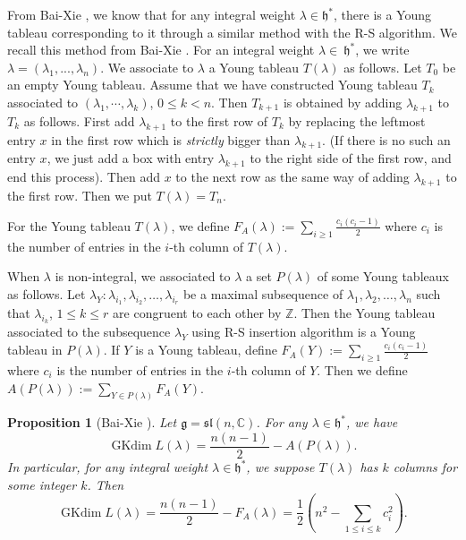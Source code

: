 \documentclass{amsart}[12pt]
\newtheorem{Pro}{Proposition}[section]
\newcommand{\gkd}{\operatorname{GKdim}}
\numberwithin{equation}{section}
\begin{document}
From Bai-Xie \cite{BX}, we know that for any integral weight $\lambda \in \mathfrak{h}^*$, there is a Young tableau corresponding to it through a similar method with the R-S algorithm.
We recall this method from Bai-Xie \cite{BX}.
For an integral weight $ \lambda\in\ \mathfrak{h}^* $, we write  $\lambda=(\lambda_1,...,\lambda_n)$. We associate to $ \lambda $ a  Young tableau  $ T(\lambda) $ as follows. Let $ T_0 $ be an empty Young tableau. Assume that we have constructed Young tableau $ T_k $ associated to $ (\lambda_1,\cdots,\lambda_k) $, $ 0\leq k<n $. Then $ T_{k+1} $ is obtained by adding $ \lambda_{k+1} $ to $ T_k $ as follows. First add $ \lambda_{k+1} $ to the first row of $ T_k $ by replacing the leftmost entry $ x $ in the first row which is \textit{strictly} bigger than $ \lambda_{k+1} $.  (If there is no such an entry $ x $, we just add a box with entry $\lambda_{k+1}  $ to the right side of the first row, and end this process). Then add $ x $ to the next row as the same way of adding $\lambda_{k+1} $ to the first row.  Then we put $T(\lambda)=T_n$.



For the Young tableau $T(\lambda)$, we define $ F_A(\lambda) :=\sum\limits_{i\geq 1}\frac{c_i(c_i-1)}2$ where $ c_i $ is the number of entries in the $ i $-th column of $T(\lambda)$.

 When  $ \lambda $ is non-integral, we  associated to $ \lambda $ a set $ P(\lambda) $ of some Young tableaux as follows. Let $ \lambda_Y:\lambda_{i_1}, \lambda_{i_2}, \dots, \lambda_{i_r} $  be a maximal subsequence of $ \lambda_1,\lambda_2,\dots,\lambda_n $ such that $ \lambda_{i_k} $, $ 1\leq k\leq r $ are congruent to each other by $ \mathbb{Z} $. Then the Young tableau associated to the subsequence $ \lambda_Y $ using R-S insertion algorithm is a Young tableau in $ P(\lambda) $. If $ Y $ is a Young tableau, define $ F_A(Y) :=\sum\limits_{i\geq 1}\frac{c_i(c_i-1)}2$ where $ c_i $ is the number of entries in the $i$-th column of $ Y $. Then we  define $ A(P(\lambda)) :=\sum_{Y\in P(\lambda)}F_A(Y)$.
	

\begin{Pro}[Bai-Xie \cite{BX}]
	Let $ \mathfrak{g}=\mathfrak{sl}(n,\mathbb{C}) $. For any $ \lambda\in\mathfrak{h}^* $, we have \[
	\gkd L(\lambda)=\frac{n(n-1)}2-A(P(\lambda)).
	\]
In particular, for any integral  weight $ \lambda\in \mathfrak{h}^* $, we suppose  $T(\lambda)$   has $k$  columns for some integer $k$. Then
$$\gkd L(\lambda)=\frac{n(n-1)}2-F_A(\lambda)=\frac{1}{2}(n^2-\sum\limits_{1\leq i \leq k}c_i^2).
$$
\end{Pro}
\end{document}
